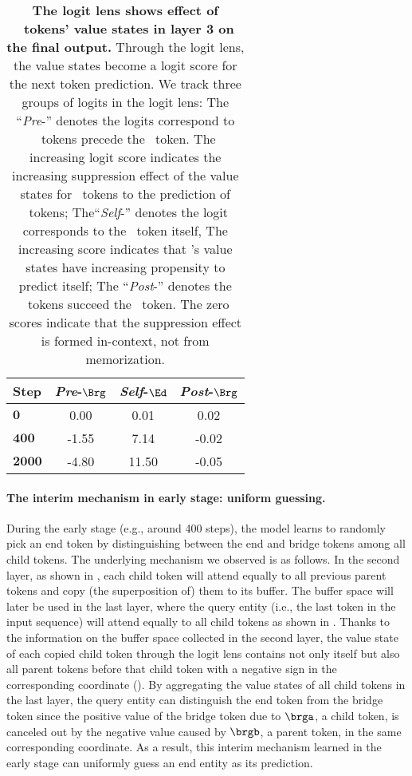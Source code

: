 \begin{table}[h]
    \centering
    \renewcommand{\arraystretch}{1} %
    \begin{tabular}{lccc}
        \toprule
        \textbf{Step} & \textit{Pre}-$\Brg$ & \textit{Self}-$\Ed$ & \textit{Post}-$\Brg$ \\
        \midrule
        $\mathbf{0}$ & 0.00 & 0.01 & 0.02 \\
        $\mathbf{400}$ & -1.55 & 7.14 & -0.02 \\
        $\mathbf{2000}$ & -4.80 & 11.50 & -0.05 \\
        \bottomrule
    \end{tabular}
    \caption{\textbf{The logit lens shows effect of \Ed~tokens' value states in layer 3 on the final output.} Through the logit lens, the value states become a logit score for the next token prediction. We track three groups of logits in the logit lens: The ``\textit{Pre}-\brg'' denotes the logits correspond to \brg~tokens precede the \Ed~token. The increasing logit score indicates the increasing suppression effect of the value states for \Ed~tokens to the prediction of \brg~tokens; The``\textit{Self}-\Ed'' denotes the logit corresponds to the \Ed~token itself, The increasing score indicates that \Ed's value states have increasing propensity to predict itself; The ``\textit{Post}-\brg'' denotes the \brg~tokens succeed the \Ed~token. The zero scores indicate that the suppression effect is formed in-context, not from memorization.}
    \label{tab:logit_lens_value}
\end{table}


\paragraph{The interim mechanism in early stage: uniform guessing.} During the early stage (e.g., around 400 steps), the model learns to randomly pick an end token by distinguishing between the end and bridge tokens among all child tokens. The underlying mechanism we observed is as follows. In the second layer, as shown in , each child token will attend equally to all previous parent tokens and copy (the superposition of) them to its buffer.  The buffer space will later be used in the last layer, where the query entity (i.e., the last token in the input sequence) will attend equally to all child tokens as shown in .  Thanks to the information on the buffer space collected in the second layer, the value state of each copied child token through the logit lens contains not only itself but also all parent tokens before that child token with a negative sign in the corresponding coordinate (). By aggregating the value states of all child tokens in the last layer, the query entity can distinguish the end token from the bridge token since the positive value of the bridge token due to $\brga$, a child token, is canceled out by the negative value caused by $\brgb$, a parent token, in the same corresponding coordinate. As a result, this interim mechanism learned in the early stage can uniformly guess an end entity as its prediction.

